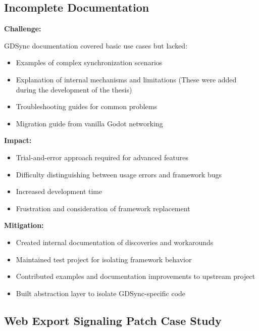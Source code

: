 \subsection{Incomplete Documentation}
\label{subsec:gdsync-documentation}

\textbf{Challenge:}

GDSync documentation covered basic use cases but lacked:
\begin{itemize}
    \item Examples of complex synchronization scenarios
    \item Explanation of internal mechanisms and limitations (These were added during the development of the thesis)
    \item Troubleshooting guides for common problems
    \item Migration guide from vanilla Godot networking
\end{itemize}

\textbf{Impact:}

\begin{itemize}
    \item Trial-and-error approach required for advanced features
    \item Difficulty distinguishing between usage errors and framework bugs
    \item Increased development time
    \item Frustration and consideration of framework replacement
\end{itemize}

\textbf{Mitigation:}

\begin{itemize}
    \item Created internal documentation of discoveries and workarounds
    \item Maintained test project for isolating framework behavior
    \item Contributed examples and documentation improvements to upstream project
    \item Built abstraction layer to isolate GDSync-specific code
\end{itemize}

\subsection{Web Export Signaling Patch Case Study}
\label{subsec:web-patch-case-study}


